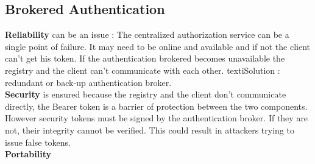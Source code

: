 \subsection{Brokered Authentication}
\textbf{Reliability} can be an issue :
The centralized authorization service can be a single point of failure. It may need to be online and available and if not the client can't get his token. If the authentication brokered becomes unavailable the registry and the client can't communicate with each other.
texti{Solution :} redundant or back-up authentication broker. \\
\textbf{Security} is ensured because the registry and the client don't communicate directly, the Bearer token is a barrier of protection between the two components.\\
However security tokens must be signed by the authentication broker. If they are not, their integrity cannot be verified. This could result in attackers trying to issue false tokens. \\
\textbf{Portability} \\
